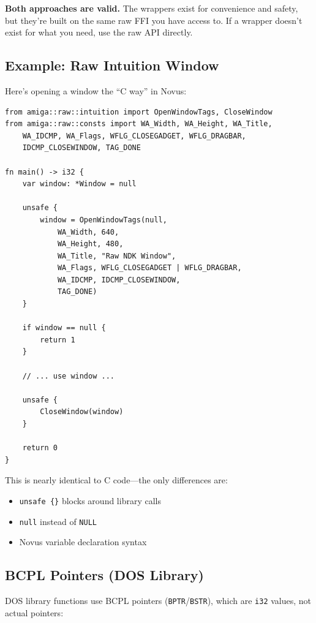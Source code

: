 \textbf{Both approaches are valid.} The wrappers exist for convenience and safety, but they're built on the same raw FFI you have access to. If a wrapper doesn't exist for what you need, use the raw API directly.

\subsection{Example: Raw Intuition Window}

Here's opening a window the ``C way'' in Novus:

\begin{lstlisting}
from amiga::raw::intuition import OpenWindowTags, CloseWindow
from amiga::raw::consts import WA_Width, WA_Height, WA_Title,
    WA_IDCMP, WA_Flags, WFLG_CLOSEGADGET, WFLG_DRAGBAR,
    IDCMP_CLOSEWINDOW, TAG_DONE

fn main() -> i32 {
    var window: *Window = null

    unsafe {
        window = OpenWindowTags(null,
            WA_Width, 640,
            WA_Height, 480,
            WA_Title, "Raw NDK Window",
            WA_Flags, WFLG_CLOSEGADGET | WFLG_DRAGBAR,
            WA_IDCMP, IDCMP_CLOSEWINDOW,
            TAG_DONE)
    }

    if window == null {
        return 1
    }

    // ... use window ...

    unsafe {
        CloseWindow(window)
    }

    return 0
}
\end{lstlisting}

This is nearly identical to C code---the only differences are:
\begin{itemize}
    \item \texttt{unsafe \{\}} blocks around library calls
    \item \texttt{null} instead of \texttt{NULL}
    \item Novus variable declaration syntax
\end{itemize}

\subsection{BCPL Pointers (DOS Library)}

DOS library functions use BCPL pointers (\texttt{BPTR}/\texttt{BSTR}), which are \texttt{i32} values, not actual pointers:

